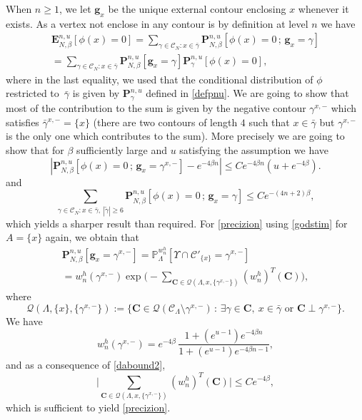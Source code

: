 \documentclass[10pt]{amsart}
\let\mathcal\mathscr
\newcommand{\sep}{\,:\,}
\numberwithin{equation}{section}
\theoremstyle{plain}
\theoremstyle{definition}
\newcommand{\bg}{\mathbf{g}}
\newcommand{\cQ}{{\ensuremath{\mathcal Q}} }
\newcommand{\cC}{{\ensuremath{\mathcal C}} }
\newcommand{\bP}{{\ensuremath{\mathbf P}} }
\newcommand{\bE}{{\ensuremath{\mathbf E}} }
\newcommand{\bC}{{\ensuremath{\mathbf C}} }
\newcommand{\bbP}{{\ensuremath{\mathbb P}} }
\newcommand{\gb}{\beta}
\newcommand{\gL}{\Lambda}
\begin{document}
When $n\ge 1$, we let $\bg_x$ be the unique external contour enclosing $x$ whenever it exists.
As a vertex not enclose in any contour is by definition at level $n$ we have
\begin{multline*}
\bE^{n,u}_{N,\gb}[ \phi(x)=0]= \sum_{\gamma\in \cC_N: x\in \bar \gamma} \bP^{n,u}_{N,\gb}\left[ \phi(x)=0\, ; \, \bg_x=\gamma \right]\\[-5pt]
=\sum_{\gamma\in \cC_N: x\in \bar \gamma} \bP^{n,u}_{N,\gb}\left[ \bg_x=\gamma \right]\bP^{n,u}_{\gamma}\left[ \phi(x)=0\right],
\end{multline*}
where in the last equality, we used that the conditional distribution of $\phi$ restricted to~$\bar \gamma$ is given by
$\bP^{n,u}_{\gamma}$ defined in \eqref{defpnu}. We are going to show that most of the contribution to the sum
is given by the negative contour $\gamma^{x,-}$ which satisfies $\bar \gamma^{x,-}=\{x\}$ (there are two contours of length $4$ such that $x\in \bar \gamma$ but
$\gamma^{x,-}$ is the only one which contributes to the sum).
More precisely we are going to show that for $\gb$ sufficiently large and $u$ satisfying the assumption we have
\begin{equation}\label{precizion}
\left| \bP^{n,u}_{N,\gb}\left[ \phi(x)=0\, ; \, \bg_x=\gamma^{x,-} \right]- e^{-4\gb n} \right|\le C e^{-4\gb n}\left(u+ e^{-4\gb}\right).
\end{equation}
and
\begin{equation}\label{pro}
\sum_{\gamma\in \cC_N: x\in \bar \gamma,\ |\tilde \gamma|\ge 6} \bP^{n,u}_{N,\gb}\left[ \phi(x)=0\, ; \, \bg_x=\gamma \right] \le C e^{-(4n+2)\gb},
\end{equation}
which yields a sharper result than required.
For \eqref{precizion}
using \eqref{godstim} for $A=\{x\}$ again, we obtain that
\begin{multline*}
\bP^{n,u}_{N,\gb}\left[ \bg_x=\gamma^{x,-}\right]= \bbP^{w^h_n}_{\gL}[\Upsilon \cap \cC'_{\{x\}}=\gamma^{x,-}]\\
=w^h_n(\gamma^{x,-})\exp\biggl(-\sum_{\bC\in \cQ(\gL,x,\{\gamma^{x,-}\})} (w^h_n)^T(\bC)\biggr),
\end{multline*}
where
\begin{equation*}
\cQ(\gL,\{x\},\{\gamma^{x,-}\}):=\{ \bC \in \cQ(\cC_{\gL}\setminus \gamma^{x,-}) \sep \exists \gamma \in \bC,\ x\in \bar \gamma \text{ or } \bC \perp \gamma^{x,-} \}.
\end{equation*}
We have\vspace*{-3pt}
\begin{equation*}
w^h_n(\gamma^{x,-})=e^{-4\gb}\,\frac{1+(e^{u-1})e^{-4\gb n}}{1+(e^{u-1})e^{-4\gb{n-1}}},
\end{equation*}
and as a consequence of \eqref{dabound2},\vspace*{-3pt}
\begin{equation*}
\biggl| \sum_{\bC\in \cQ(\gL,x,\{\gamma^{x,-}\})} (w^h_n)^T(\bC) \biggr| \le C e^{-4\gb},
\end{equation*}
which is sufficient to yield \eqref{precizion}.
\end{document}
